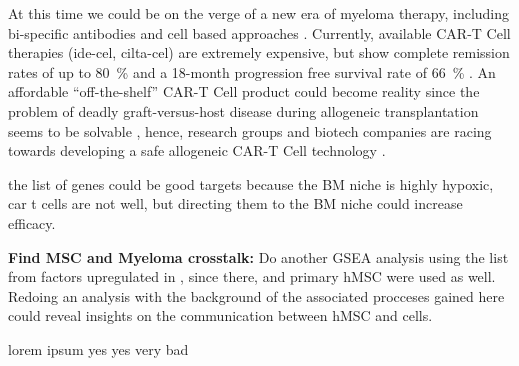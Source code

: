 At this time we could be on the verge of a new era of myeloma therapy,
including bi-specific antibodies and cell based approaches
\cite{moreNovelImmunotherapiesCombinations2023,
      engelhardtFunctionalCureLongterm2024}. Currently, available CAR-T Cell therapies
(ide-cel, cilta-cel) are extremely expensive, but show complete remission rates
of up to \SI{80}{\percent} and a 18-month progression free survival rate of
\SI{66}{\percent} \cite{bobinRecentAdvancesTreatment2022}. An affordable
``off-the-shelf'' CAR-T Cell product could become reality since the problem of
deadly graft-versus-host disease during allogeneic transplantation seems to be
solvable \cite{qasimMolecularRemissionInfant2017}, hence, research groups and
biotech companies are racing towards developing a safe allogeneic CAR-T Cell
technology \cite{depilOfftheshelfAllogeneicCAR2020}.


the list of genes could be good targets because the BM niche is highly hypoxic,
car t cells are not well, but directing them to the BM niche could increase
efficacy.


\textbf{Find MSC and Myeloma crosstalk:}
Do another GSEA analysis using the list from factors upregulated in
\citet{dotterweichContactMyelomaCells2016}, since there, \INA and primary
\ac{hMSC} were used as well. Redoing an analysis with the background of the
associated procceses gained here could reveal insights on the communication
between \ac{hMSC} and \INA cells.



%
\label{sec:discussion_conclusion_cancer}%

lorem ipsum yes yes very bad








